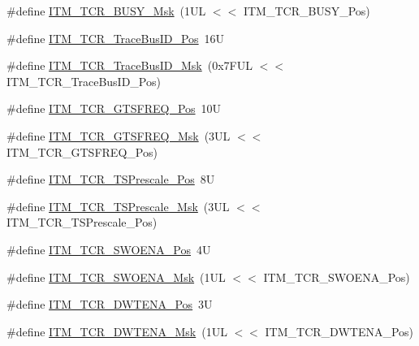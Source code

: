 \begin{DoxyCompactItemize}
\#define \mbox{\hyperlink{group___c_m_s_i_s___i_t_m_ga43ad7cf33de12f2ef3a412d4f354c60f}{I\+T\+M\+\_\+\+T\+C\+R\+\_\+\+B\+U\+S\+Y\+\_\+\+Msk}}~(1\+U\+L $<$$<$ I\+T\+M\+\_\+\+T\+C\+R\+\_\+\+B\+U\+S\+Y\+\_\+\+Pos)
\item 
\#define \mbox{\hyperlink{group___c_m_s_i_s___i_t_m_gaca0281de867f33114aac0636f7ce65d3}{I\+T\+M\+\_\+\+T\+C\+R\+\_\+\+Trace\+Bus\+I\+D\+\_\+\+Pos}}~16U
\item 
\#define \mbox{\hyperlink{group___c_m_s_i_s___i_t_m_ga60c20bd9649d1da5a2be8e656ba19a60}{I\+T\+M\+\_\+\+T\+C\+R\+\_\+\+Trace\+Bus\+I\+D\+\_\+\+Msk}}~(0x7\+F\+U\+L $<$$<$ I\+T\+M\+\_\+\+T\+C\+R\+\_\+\+Trace\+Bus\+I\+D\+\_\+\+Pos)
\item 
\#define \mbox{\hyperlink{group___c_m_s_i_s___i_t_m_ga96c7c7cbc0d98426c408090b41f583f1}{I\+T\+M\+\_\+\+T\+C\+R\+\_\+\+G\+T\+S\+F\+R\+E\+Q\+\_\+\+Pos}}~10U
\item 
\#define \mbox{\hyperlink{group___c_m_s_i_s___i_t_m_gade862cf009827f7f6748fc44c541b067}{I\+T\+M\+\_\+\+T\+C\+R\+\_\+\+G\+T\+S\+F\+R\+E\+Q\+\_\+\+Msk}}~(3\+U\+L $<$$<$ I\+T\+M\+\_\+\+T\+C\+R\+\_\+\+G\+T\+S\+F\+R\+E\+Q\+\_\+\+Pos)
\item 
\#define \mbox{\hyperlink{group___c_m_s_i_s___i_t_m_gad7bc9ee1732032c6e0de035f0978e473}{I\+T\+M\+\_\+\+T\+C\+R\+\_\+\+T\+S\+Prescale\+\_\+\+Pos}}~8U
\item 
\#define \mbox{\hyperlink{group___c_m_s_i_s___i_t_m_ga7a723f71bfb0204c264d8dbe8cc7ae52}{I\+T\+M\+\_\+\+T\+C\+R\+\_\+\+T\+S\+Prescale\+\_\+\+Msk}}~(3\+U\+L $<$$<$ I\+T\+M\+\_\+\+T\+C\+R\+\_\+\+T\+S\+Prescale\+\_\+\+Pos)
\item 
\#define \mbox{\hyperlink{group___c_m_s_i_s___i_t_m_ga7a380f0c8078f6560051406583ecd6a5}{I\+T\+M\+\_\+\+T\+C\+R\+\_\+\+S\+W\+O\+E\+N\+A\+\_\+\+Pos}}~4U
\item 
\#define \mbox{\hyperlink{group___c_m_s_i_s___i_t_m_ga97476cb65bab16a328b35f81fd02010a}{I\+T\+M\+\_\+\+T\+C\+R\+\_\+\+S\+W\+O\+E\+N\+A\+\_\+\+Msk}}~(1\+U\+L $<$$<$ I\+T\+M\+\_\+\+T\+C\+R\+\_\+\+S\+W\+O\+E\+N\+A\+\_\+\+Pos)
\item 
\#define \mbox{\hyperlink{group___c_m_s_i_s___i_t_m_ga30e83ebb33aa766070fe3d1f27ae820e}{I\+T\+M\+\_\+\+T\+C\+R\+\_\+\+D\+W\+T\+E\+N\+A\+\_\+\+Pos}}~3U
\item 
\#define \mbox{\hyperlink{group___c_m_s_i_s___i_t_m_ga98ea1c596d43d3633a202f9ee746cf70}{I\+T\+M\+\_\+\+T\+C\+R\+\_\+\+D\+W\+T\+E\+N\+A\+\_\+\+Msk}}~(1\+U\+L $<$$<$ I\+T\+M\+\_\+\+T\+C\+R\+\_\+\+D\+W\+T\+E\+N\+A\+\_\+\+Pos)
\item 

\end{DoxyCompactItemize}
